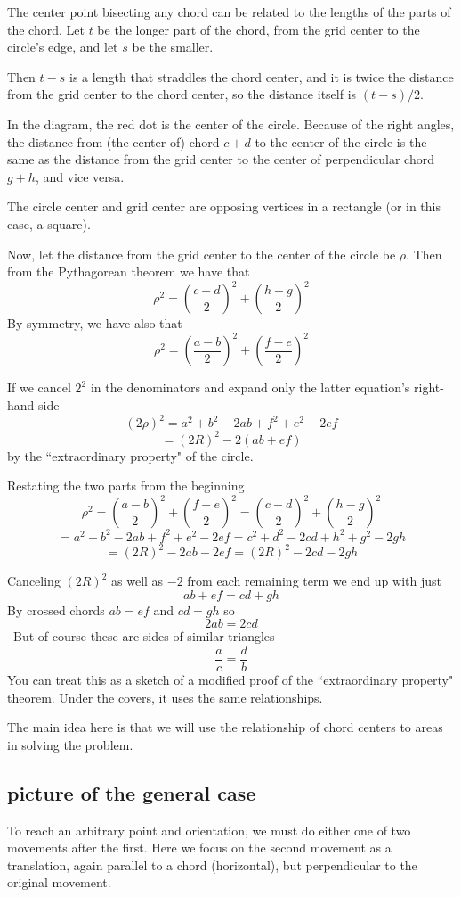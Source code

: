 \documentclass[11pt, oneside]{article}
\begin{document}
The center point bisecting any chord can be related to the lengths of the parts of the chord.  Let $t$ be the longer part of the chord, from the grid center to the circle's edge, and let $s$ be the smaller.  

Then $t-s$ is a length that straddles the chord center, and it is twice the distance from the grid center to the chord center, so the distance itself is $(t-s)/2$.

In the diagram, the red dot is the center of the circle.  Because of the right angles, the distance from (the center of) chord $c+d$ to the center of the circle is the same as the distance from the grid center to the center of perpendicular chord $g + h$, and vice versa.  

The circle center and grid center are opposing vertices in a rectangle (or in this case, a square).

Now, let the distance from the grid center to the center of the circle be $\rho$.  Then from the Pythagorean theorem we have that
\[ \rho^2 = (\frac{c - d}{2})^2 + (\frac{h - g}{2})^2 \]
By symmetry, we have also that
\[ \rho^2 = (\frac{a - b}{2})^2 + (\frac{f - e}{2})^2  \]

If we cancel $2^2$ in the denominators and expand only the latter equation's right-hand side
\[  (2 \rho)^2 = a^2 + b^2 - 2ab + f^2 + e^2 - 2ef \]
\[ = (2R)^2 - 2 (ab + ef) \]
by the ``extraordinary property" of the circle.  

Restating the two parts from the beginning
\[  \rho^2 = (\frac{a - b}{2})^2 + (\frac{f - e}{2})^2 = (\frac{c - d}{2})^2 + (\frac{h - g}{2})^2  \]
\[ = a^2 + b^2 - 2ab + f^2 + e^2 - 2ef = c^2 + d^2 - 2cd + h^2 + g^2 - 2gh \]
\[ = (2R)^2 - 2ab - 2ef = (2R)^2 - 2cd - 2gh \]

Canceling $(2R)^2$ as well as $-2$ from each remaining term we end up with just
\[ ab + ef = cd + gh \]
By crossed chords $ab = ef$ and $cd = gh$ so
\[ 2ab = 2cd \]
\
But of course these are sides of similar triangles
\[ \frac{a}{c} = \frac{d}{b} \]
You can treat this as a sketch of a modified proof of the ``extraordinary property" theorem.  Under the covers, it uses the same relationships.

The main idea here is that we will use the relationship of chord centers to areas in solving the problem.

\subsection*{picture of the general case}
To reach an arbitrary point and orientation, we must do either one of two movements after the first.  Here we focus on the second movement as a translation, again parallel to a chord (horizontal), but perpendicular to the original movement.  
\end{document}
